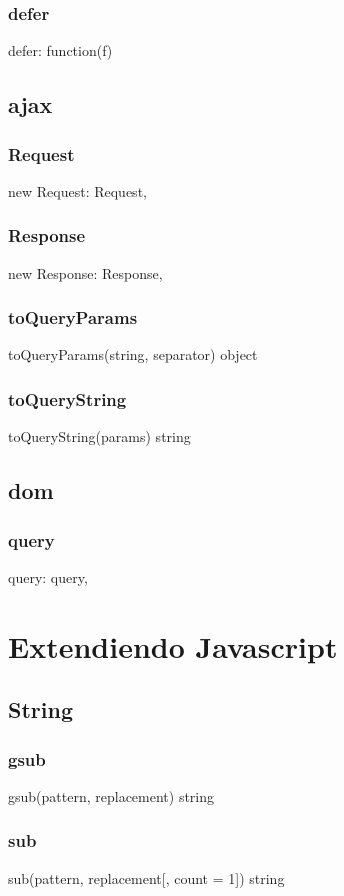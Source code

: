 {{{{{{{\subsubsection*{defer}
defer: function(f) {

\subsection{ajax}
\subsubsection*{Request}
new Request: Request,
\subsubsection*{Response}
new Response: Response,
\subsubsection*{toQueryParams}
toQueryParams(string, separator) \rightarrow object
\subsubsection*{toQueryString}
toQueryString(params) \rightarrow string

\subsection{dom}
\subsubsection*{query}
query: query,

\section{Extendiendo Javascript}
\subsection{String}
\subsubsection*{gsub}
gsub(pattern, replacement) \rightarrow string
\subsubsection*{sub}
sub(pattern, replacement[, count = 1]) \rightarrow string
}}}}}}}}
